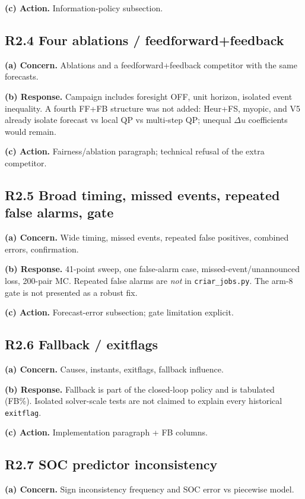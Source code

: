 \documentclass[11pt]{article}
\begin{document}
\textbf{(c) Action.} Information-policy subsection.

\subsection*{R2.4 Four ablations / feedforward+feedback}
\textbf{(a) Concern.} Ablations and a feedforward+feedback competitor with the same forecasts.

\textbf{(b) Response.} Campaign includes foresight OFF, unit horizon, isolated event inequality. A fourth FF+FB structure was not added: Heur+FS, myopic, and V5 already isolate forecast vs local QP vs multi-step QP; unequal $\Delta u$ coefficients would remain.

\textbf{(c) Action.} Fairness/ablation paragraph; technical refusal of the extra competitor.

\subsection*{R2.5 Broad timing, missed events, repeated false alarms, gate}
\textbf{(a) Concern.} Wide timing, missed events, repeated false positives, combined errors, confirmation.

\textbf{(b) Response.} 41-point sweep, one false-alarm case, missed-event/unannounced loss, 200-pair MC. Repeated false alarms are \emph{not} in \texttt{criar\_jobs.py}. The arm-8 gate is not presented as a robust fix.

\textbf{(c) Action.} Forecast-error subsection; gate limitation explicit.

\subsection*{R2.6 Fallback / exitflags}
\textbf{(a) Concern.} Causes, instants, exitflags, fallback influence.

\textbf{(b) Response.} Fallback is part of the closed-loop policy and is tabulated (FB\%). Isolated solver-scale tests are not claimed to explain every historical \texttt{exitflag}.

\textbf{(c) Action.} Implementation paragraph + FB columns.

\subsection*{R2.7 SOC predictor inconsistency}
\textbf{(a) Concern.} Sign inconsistency frequency and SOC error vs piecewise model.
\end{document}
